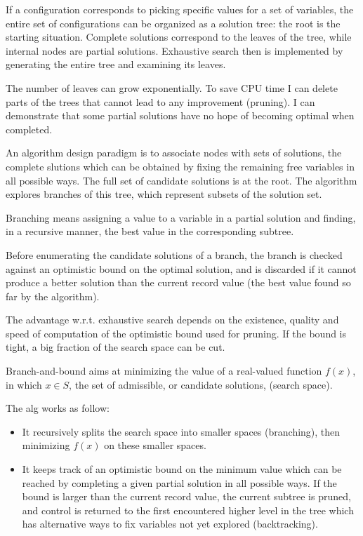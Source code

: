 \documentclass[10pt]{article}
\begin{document}
If a configuration corresponds to picking specific values for a set of variables, the entire set of configurations can be organized as a solution tree: the root is the starting situation.
Complete solutions correspond to the leaves of the tree, while internal nodes are partial solutions. Exhaustive search then is implemented by generating the entire tree and examining its leaves.
 
The number of leaves can grow exponentially. To save CPU time I can delete parts of the trees that cannot lead to any improvement (pruning). I can demonstrate that some partial solutions have no hope of becoming optimal when completed.

An algorithm design paradigm is to associate nodes with sets of solutions, the complete slutions which can be obtained by fixing the remaining free variables in all possible ways. The full set of candidate solutions is at the root. The algorithm explores branches of this tree, which represent subsets of the solution set. 

Branching means assigning a value to a variable in a partial solution and finding, in a recursive manner, the best value in the corresponding subtree. 

Before enumerating the candidate solutions of a branch, the branch is checked against an optimistic bound on the optimal solution, and
is discarded if it cannot produce a better solution than the current record value (the best value found so far by the algorithm).

The advantage w.r.t. exhaustive search depends on the existence, quality and speed of computation of the optimistic bound used for pruning. If the bound is tight, a big fraction of the search space can be cut.

Branch-and-bound aims at minimizing the value of a real-valued function $ f(x) $, in which $ x \in S $, the set of admissible, or candidate solutions, (search space).

The alg works as follow:

\begin{itemize}
\item It recursively splits the search space into smaller spaces (branching), then minimizing $ f(x) $ on these smaller spaces.
\item It keeps track of an optimistic bound on the minimum value which can be reached by completing a given partial solution in all possible ways. If the bound is larger than the current record value, the current subtree is pruned, and control is returned to the first encountered higher level in the tree which has alternative ways to fix variables
not yet explored (backtracking).
\end{itemize}
\end{document}
